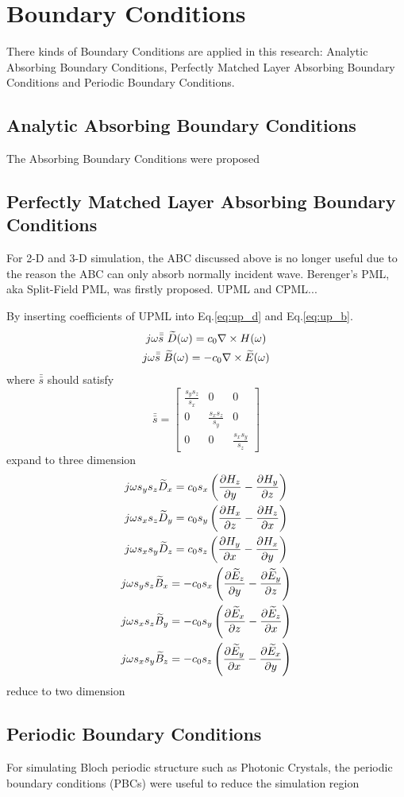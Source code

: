 \section{Boundary Conditions}
\label{sec:bcs}
There kinds of Boundary Conditions are applied in this research: Analytic Absorbing Boundary Conditions, Perfectly
Matched Layer Absorbing Boundary Conditions and Periodic Boundary Conditions.
\subsection{Analytic Absorbing Boundary Conditions}

The Absorbing Boundary Conditions were proposed

\subsection{Perfectly Matched Layer Absorbing Boundary Conditions}
\label{subsec:pml}
For 2-D and 3-D simulation, the ABC discussed above is no longer useful due to the reason the ABC can only absorb
normally incident wave. Berenger's PML, aka Split-Field PML, was firstly proposed. UPML and CPML...

By inserting coefficients of UPML into Eq.\ref{eq:up_d} and Eq.\ref{eq:up_b}.
\begin{gather}
  j\omega\bar{\bar{s}}\ \widetilde{D}(\omega) = c_0\nabla\times H(\omega)\\
  j\omega\bar{\bar{s}}\ \widetilde{B}(\omega) = -c_0\nabla\times \widetilde{E}(\omega)
\end{gather}
where $\bar{\bar{s}}$ should satisfy
\begin{equation}
  \bar{\bar{s}} = 
  \begin{bmatrix}
    \displaystyle\frac{s_ys_z}{s_x}& 0& 0\\
    0& \displaystyle\frac{s_xs_z}{s_y}& 0\\
    0& 0& \displaystyle\frac{s_xs_y}{s_z}
  \end{bmatrix}
\end{equation}
expand to three dimension
\begin{gather}
  j\omega s_y s_z \widetilde{D}_x = c_0 s_x \left( \frac{\partial H_z}{\partial y} - \frac{\partial H_y}{\partial z} \right)\\
  j\omega s_x s_z \widetilde{D}_y = c_0 s_y \left( \frac{\partial H_x}{\partial z} - \frac{\partial H_z}{\partial x} \right)\\
  j\omega s_x s_y \widetilde{D}_z = c_0 s_z \left( \frac{\partial H_y}{\partial x} - \frac{\partial H_x}{\partial y} \right)\\
  j\omega s_y s_z \widetilde{B}_x =-c_0 s_x \left(\frac{\partial \widetilde{E}_z}{\partial y} - \frac{\partial \widetilde{E}_y}{\partial z}\right)\\
  j\omega s_x s_z \widetilde{B}_y =-c_0 s_y \left(\frac{\partial \widetilde{E}_x}{\partial z} - \frac{\partial \widetilde{E}_z}{\partial x}\right)\\
  j\omega s_x s_y \widetilde{B}_z =-c_0 s_z \left(\frac{\partial \widetilde{E}_y}{\partial x} - \frac{\partial \widetilde{E}_x}{\partial y}\right)
\end{gather}
reduce to two dimension




\subsection{Periodic Boundary Conditions}

For simulating Bloch periodic structure such as Photonic Crystals, the periodic boundary conditions (PBCs) were useful
to reduce the simulation region
